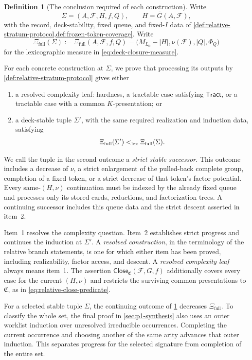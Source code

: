 \documentclass[11pt,letterpaper,onecolumn]{article}
\theoremstyle{plain}
\theoremstyle{definition}
\newtheorem{definition}[definition]{Definition}
\theoremstyle{remark}
\newcommand{\cF}{\mathcal F}
\newcommand{\Tract}{\mathsf{Tract}}
\newcommand{\Close}{\mathsf{Close}}
\begin{document}
\begin{definition}[The conclusion required of each construction]
\label{def:protocol-discharged}
Write
\[
 \Sigma=(A,\cF,H,f,Q),
 \qquad H=\overline G(A,\cF),
\]
with the record, deck-stability, fixed queue, and fixed-\(I\) data of
\cref{def:relative-stratum-protocol,def:frozen-token-coverage}.  Write
\[
 \Xi_{\mathrm{full}}(\Sigma)
 :=\Xi_{\mathrm{full}}(A,\cF,f,Q)
 =\bigl(M_{L_0}-|H|,\nu(\cF),|Q|,\Phi_Q\bigr)
\]
for the lexicographic measure in \cref{eq:deck-closure-measure}.

For each concrete construction at \(\Sigma\), we prove that processing its
outputs by \cref{def:relative-stratum-protocol} gives either
\begin{enumerate}
\item a resolved complexity leaf: hardness, a tractable case satisfying \(\Tract\), or
      a tractable case with a common \(K\)-presentation; or
\item a deck-stable tuple \(\Sigma'\), with the same required realization and
      induction data, satisfying
      \[
        \Xi_{\mathrm{full}}(\Sigma')<_{\rm lex}\Xi_{\mathrm{full}}(\Sigma).
      \]
\end{enumerate}
We call the tuple in the second outcome a \emph{strict stable successor}.
This outcome includes a decrease of \(\nu\), a strict enlargement of
the pulled-back complete group, completion of a fixed token, or a strict
decrease of that token's factor potential.  Every
same-\((H,\nu)\) continuation must be indexed by the already fixed queue
and processes only its stored cards, reductions, and factorization trees. A
continuing successor includes this queue data and the strict descent
asserted in item~2.

Item~1 resolves the complexity question. Item~2 establishes strict
progress and continues the induction at \(\Sigma'\). A \emph{resolved
construction}, in the terminology of the relative branch statements,
is one for which either item has been proved, including realizability,
factor access, and descent. A \emph{resolved complexity leaf} always
means item~1.
The assertion \(\Close_{\mathfrak C}(\cF,G,f)\) additionally covers
every case for the current \((H,\nu)\) and restricts the surviving common
presentations to \(\mathfrak C\), as in \cref{eq:relative-close-predicate}.
\end{definition}

For a selected stable tuple \(\Sigma\), the continuing outcome of
\cref{def:protocol-discharged} decreases \(\Xi_{\mathrm{full}}\). To classify the whole
set, the final proof in \cref{sec:p1-synthesis} also uses an outer worklist
induction over unresolved irreducible occurrences. Completing the current
occurrence and choosing another of the same arity advances that outer
induction. This separates progress for the selected signature from
completion of the entire set.
\end{document}
